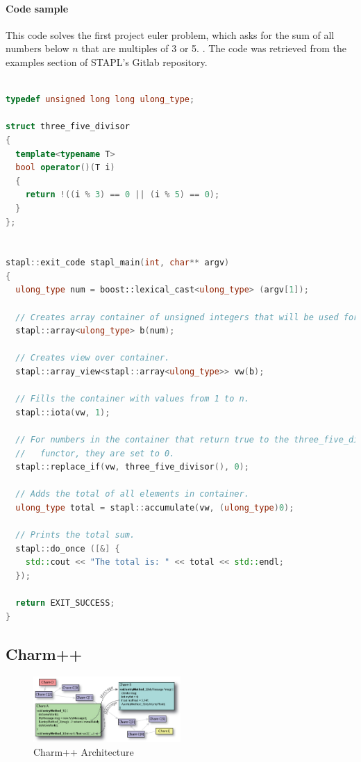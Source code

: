 \paragraph{Code sample}
This code solves the first project euler problem, which asks for the sum of all numbers below $n$ that are multiples of 3 or 5. \cite{euler_1}. The code was retrieved from the examples section of STAPL's Gitlab repository. 
\scriptsize
\begin{lstlisting}[language=C++, caption=STAPL code sample for Project Euler number 1. Headers and doxygen comments removed for brevity, captionpos=b]

typedef unsigned long long ulong_type;

struct three_five_divisor
{
  template<typename T>
  bool operator()(T i)
  {
    return !((i % 3) == 0 || (i % 5) == 0);
  }
};


stapl::exit_code stapl_main(int, char** argv)
{
  ulong_type num = boost::lexical_cast<ulong_type> (argv[1]);

  // Creates array container of unsigned integers that will be used for storage.
  stapl::array<ulong_type> b(num);

  // Creates view over container.
  stapl::array_view<stapl::array<ulong_type>> vw(b);

  // Fills the container with values from 1 to n.
  stapl::iota(vw, 1);

  // For numbers in the container that return true to the three_five_divisor
  //   functor, they are set to 0.
  stapl::replace_if(vw, three_five_divisor(), 0);

  // Adds the total of all elements in container.
  ulong_type total = stapl::accumulate(vw, (ulong_type)0);

  // Prints the total sum.
  stapl::do_once ([&] {
    std::cout << "The total is: " << total << std::endl;
  });

  return EXIT_SUCCESS;
} \end{lstlisting}
\normalsize
\subsection{Charm++}
\begin{figure}[h]
	\centering
	\includegraphics[width=0.5\textwidth]{Figures/charm_arch.jpg}
	\caption{Charm++ Architecture \cite{charm_tutorial}}
	\label{fig:charm_arch}
\end{figure}
